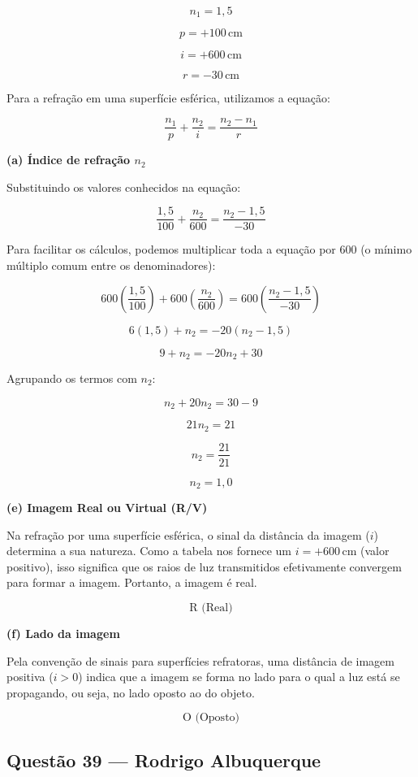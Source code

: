 \documentclass[12pt,a4paper]{article}
\begin{document}
\[
n_1 = 1,5
\]

\[
p = +100\,\text{cm}
\]

\[
i = +600\,\text{cm}
\]

\[
r = -30\,\text{cm}
\]

Para a refração em uma superfície esférica, utilizamos a equação:

\[
\frac{n_1}{p} + \frac{n_2}{i} = \frac{n_2 - n_1}{r}
\]

\textbf{(a) Índice de refração \(n_2\)}

Substituindo os valores conhecidos na equação:

\[
\frac{1,5}{100} + \frac{n_2}{600} = \frac{n_2 - 1,5}{-30}
\]

Para facilitar os cálculos, podemos multiplicar toda a equação por \(600\) (o mínimo múltiplo comum entre os denominadores):

\[
600 \left( \frac{1,5}{100} \right) + 600 \left( \frac{n_2}{600} \right) = 600 \left( \frac{n_2 - 1,5}{-30} \right)
\]

\[
6(1,5) + n_2 = -20(n_2 - 1,5)
\]

\[
9 + n_2 = -20n_2 + 30
\]

Agrupando os termos com \(n_2\):

\[
n_2 + 20n_2 = 30 - 9
\]

\[
21n_2 = 21
\]

\[
n_2 = \frac{21}{21}
\]

\[
\boxed{n_2 = 1,0}
\]

\textbf{(e) Imagem Real ou Virtual (R/V)}

Na refração por uma superfície esférica, o sinal da distância da imagem (\(i\)) determina a sua natureza. Como a tabela nos fornece um \(i = +600\,\text{cm}\) (valor positivo), isso significa que os raios de luz transmitidos efetivamente convergem para formar a imagem. Portanto, a imagem é real.

\[
\boxed{\text{R (Real)}}
\]

\textbf{(f) Lado da imagem}

Pela convenção de sinais para superfícies refratoras, uma distância de imagem positiva (\(i > 0\)) indica que a imagem se forma no lado para o qual a luz está se propagando, ou seja, no lado oposto ao do objeto.

\[
\boxed{\text{O (Oposto)}}
\]

\subsection{Questão 39 — Rodrigo Albuquerque}
\end{document}
